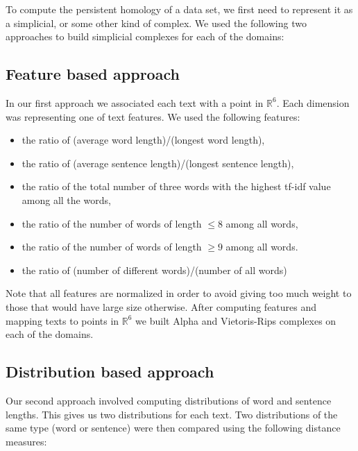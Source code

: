 \documentclass[12pt,a4paper]{amsart}
\def\R{\mathbb R}
\begin{document}
To compute the persistent homology of a data set, we first need to represent it
as a simplicial, or some other kind of complex. We used the following two
approaches to build simplicial complexes for each of the domains:

\subsection{Feature based approach}

In our first approach we associated each text with a point in $\R ^6$. Each
dimension was representing one of text features. We used the following features:
\begin{itemize}
  \setlength\itemsep{0.5em}
  \item the ratio of (average word length)/(longest word length),
  \item the ratio of (average sentence length)/(longest sentence length),
  \item the ratio of the total number of three words with the highest tf-idf
    value among all the words,
  \item the ratio of the number of words of length $\le 8$ among all words,
  \item the ratio of the number of words of length $\ge 9$ among all words.
  \item the ratio of (number of different words)/(number of all words)
\end{itemize}

Note that all features are normalized in order to avoid giving too much weight
to those that would have large size otherwise.
After computing features and mapping texts to points in $\R ^6$ we
built Alpha and Vietoris-Rips complexes on each of the domains.

\subsection{Distribution based approach}

Our second approach involved computing distributions of word and sentence
lengths. This gives us two distributions for each text. Two distributions of the
same type (word or sentence) were then compared using the following distance
measures:
\end{document}
